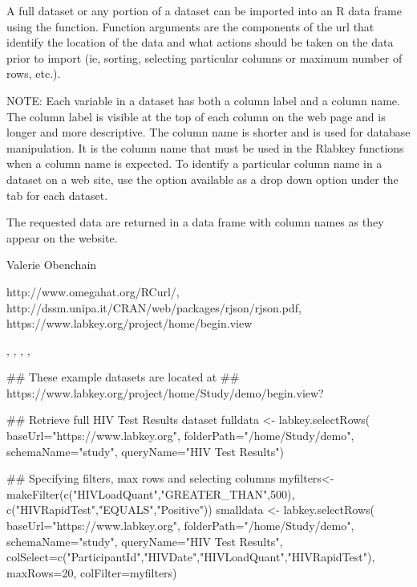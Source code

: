 \begin{Details}\relax
A full dataset or any portion of a dataset can be imported into an R data frame using the 
 function. Function arguments are the components of the url that identify
the location of the data and what actions should be taken on the data prior to import
(ie, sorting, selecting particular columns or maximum number of rows, etc.).

NOTE: Each variable in a dataset has both a column label and a column name. The column label is visible at the top
of each column on the web page and is longer and more descriptive. The column name is shorter and is
used  for database manipulation. It is the column name that must be used in
the Rlabkey functions when a column name is expected. To identify a particular column name in a dataset on
a web site, use the  option available as a drop down option under the 
tab for each dataset.
\end{Details}
\begin{Value}
The requested data are returned in a data frame with column names as they appear on the website.
\end{Value}
\begin{Author}\relax
Valerie Obenchain
\end{Author}
\begin{References}\relax
http://www.omegahat.org/RCurl/,\\ 
http://dssm.unipa.it/CRAN/web/packages/rjson/rjson.pdf,\\
https://www.labkey.org/project/home/begin.view
\end{References}
\begin{SeeAlso}\relax
{}, , , 
, \\
\end{SeeAlso}
\begin{Examples}
\begin{ExampleCode}
## These example datasets are located at 
## https://www.labkey.org/project/home/Study/demo/begin.view?

## Retrieve full HIV Test Results dataset
fulldata <- labkey.selectRows(  
baseUrl="https://www.labkey.org", 
folderPath="/home/Study/demo", 
schemaName="study", 
queryName="HIV Test Results")

## Specifying filters, max rows and selecting columns
myfilters<- makeFilter(c("HIVLoadQuant","GREATER_THAN",500), 
                                           c("HIVRapidTest","EQUALS","Positive"))
smalldata <- labkey.selectRows( 
baseUrl="https://www.labkey.org", 
folderPath="/home/Study/demo", 
schemaName="study",     
queryName="HIV Test Results", 
colSelect=c("ParticipantId","HIVDate","HIVLoadQuant","HIVRapidTest"), 
maxRows=20,
colFilter=myfilters)


\end{ExampleCode}
\end{Examples}

